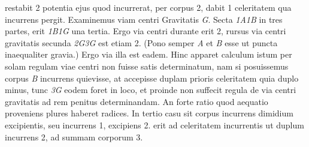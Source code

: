 %
restabit 2 potentia ejus quod incurrerat,  
%
per corpus 2, dabit 1 celeritatem qua incurrens pergit. 
%
%
{%
} 
\pend
%
\pstart
%
Examinemus viam centri Gravitatis\protect{} \textit{G}. Secta \textit{\scriptsize 1}\textit{A}\textit{\scriptsize 1}\textit{B} in tres partes, erit \textit{\scriptsize 1}\textit{B}\textit{\scriptsize 1}\textit{G} una tertia. 
%
Ergo via centri
%
%
durante erit 2, rursus via centri gravitatis\protect{} secunda \textit{\scriptsize 2}\textit{G}\textit{\scriptsize 3}\textit{G} est etiam 2. (Pono semper \textit{A} et \textit{B} esse ut puncta\protect{} inaequaliter gravia.) Ergo via illa est eadem. 
%
Hinc apparet calculum istum per solam regulam 
%
viae centri\protect{} non fuisse satis determinatum, 
%
nam si posuissemus corpus \textit{B} incurrens quievisse, 
%
at 
accepisse duplam prioris celeritatem quia duplo minus, tunc \textit{\scriptsize 3}\textit{G} eodem
%
foret in loco, et proinde non suffecit regula de via centri gravitatis\protect{} ad rem penitus determinandam. An forte ratio 
%
quod aequatio proveniens plures haberet radices. \pend 
%
\pstart 
%
In tertio casu sit corpus incurrens dimidium excipientis, seu incurrens 1, excipiens 2. 
%
%
erit ad celeritatem incurrentis ut duplum incurrens 2, ad summam corporum 3. 
